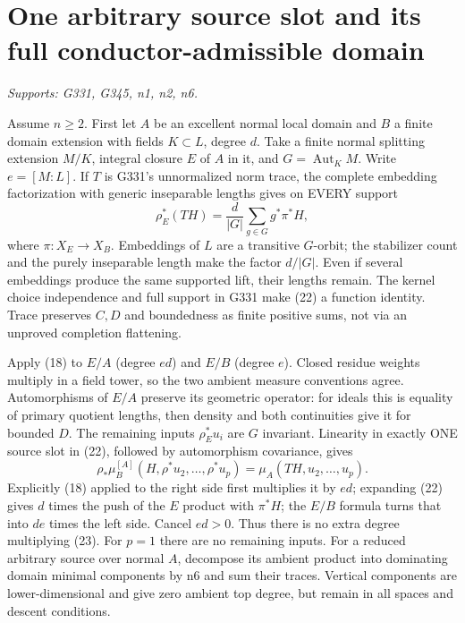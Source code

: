 \section{One arbitrary source slot and its full conductor-admissible domain}
\textit{Supports: G331, G345, n1, n2, n6.}

Assume $n\ge2$. First let $A$ be an excellent normal local domain and $B$ a finite domain extension with fields $K\subset L$, degree $d$. Take a finite normal splitting extension $M/K$, integral closure $E$ of $A$ in it, and $G=\operatorname{Aut}_K M$. Write $e=[M:L]$. If $T$ is G331's unnormalized norm trace, the complete embedding factorization with generic inseparable lengths gives on EVERY support
\[
\rho_E^*(TH)=\frac d{|G|}\sum_{g\in G} g^*\pi^*H,     \tag{22}
\]
where $\pi:X_E\to X_B$. Embeddings of $L$ are a transitive $G$-orbit; the stabilizer count and the purely inseparable length make the factor $d/|G|$. Even if several embeddings produce the same supported lift, their lengths remain. The kernel choice independence and full support in G331 make (22) a function identity. Trace preserves $C,D$ and boundedness as finite positive sums, not via an unproved completion flattening.

Apply (18) to $E/A$ (degree $ed$) and $E/B$ (degree $e$). Closed residue weights multiply in a field tower, so the two ambient measure conventions agree. Automorphisms of $E/A$ preserve its geometric operator: for ideals this is equality of primary quotient lengths, then density and both continuities give it for bounded $D$. The remaining inputs $\rho_E^*u_i$ are $G$ invariant. Linearity in exactly ONE source slot in (22), followed by automorphism covariance, gives
\[
\rho_*\mu_B^{[A]}(H,\rho^*u_2,\ldots,\rho^*u_p)
=\mu_A(TH,u_2,\ldots,u_p).                            \tag{23}
\]
Explicitly (18) applied to the right side first multiplies it by $ed$; expanding (22) gives $d$ times the push of the $E$ product with $\pi^*H$; the $E/B$ formula turns that into $de$ times the left side. Cancel $ed>0$. Thus there is no extra degree multiplying (23). For $p=1$ there are no remaining inputs. For a reduced arbitrary source over normal $A$, decompose its ambient product into dominating domain minimal components by n6 and sum their traces. Vertical components are lower-dimensional and give zero ambient top degree, but remain in all spaces and descent conditions.

